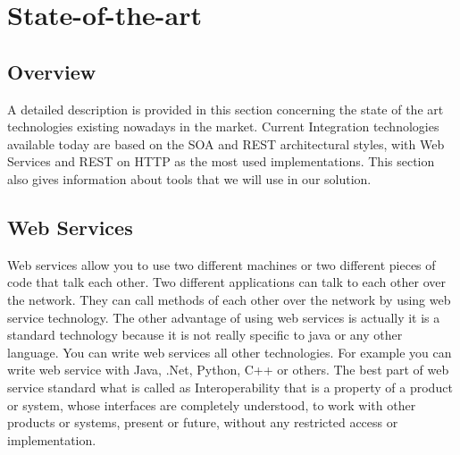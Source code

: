 
\chapter{State-of-the-art}
\label{chapter:stateofart}


\section{Overview}
\label{section:overview}

A detailed description is provided in this section concerning the state of the art technologies existing nowadays in the
market. Current Integration technologies available today are based on the SOA and REST architectural styles, with Web Services
and REST on HTTP as the most used implementations. This section also gives information about tools that we will use in our
solution.

\section{Web Services}
\label{section:webservices}

Web services allow you to use two different machines or two different pieces of code that talk each other. Two different
applications can talk to each other over the network. They can call methods of each other over the network by using web
service technology. The other advantage of using web services is actually it is a standard technology because it is not
really specific to java or any other language. You can write web services all other technologies. For example you can write
web service with Java, .Net, Python, C++ or others. The best part of web service standard what is called as Interoperability
that  is a property of a product or system, whose interfaces are completely understood, to work with other products or
systems, present or future, without any restricted access or implementation\citep{interoperability:2016:Online}.

